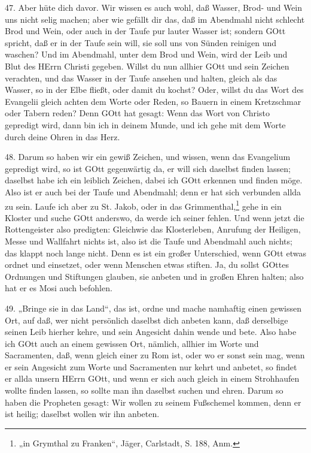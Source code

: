 47. Aber hüte dich davor. Wir wissen es auch wohl, daß Wasser, Brod- und Wein uns nicht selig machen; aber wie gefällt dir das, daß im Abendmahl nicht schlecht Brod und Wein, oder auch in der Taufe pur lauter Wasser ist; sondern GOtt spricht, daß er in der Taufe sein will, sie soll uns von Sünden reinigen und waschen? Und im Abendmahl, unter dem Brod und Wein, wird der Leib und Blut des HErrn Christi gegeben. Willst du nun allhier GOtt und sein Zeichen verachten, und das Wasser in der Taufe ansehen und halten, gleich als das Wasser, so in der Elbe fließt, oder damit du kochst? Oder, willst du das Wort des Evangelii gleich achten dem Worte oder Reden, so Bauern in einem Kretzschmar oder Tabern reden? Denn GOtt hat gesagt: Wenn das Wort von Christo gepredigt wird, dann bin ich in deinem Munde, und ich gehe mit dem Worte durch deine Ohren in das Herz.

48. Darum so haben wir ein gewiß Zeichen, und wissen, wenn das Evangelium gepredigt wird, so ist GOtt gegenwärtig da, er will sich daselbst finden lassen; daselbst habe ich ein leiblich Zeichen, dabei ich GOtt erkennen und finden möge. Also ist er auch bei der Taufe und Abendmahl; denn er hat sich verbunden allda zu sein. Laufe ich aber zu St. Jakob, oder in das Grimmenthal,\footnote{„in Grymthal zu Franken“, Jäger, Carlstadt, S. 188, Anm.} gehe in ein Kloster und suche GOtt anderswo, da werde ich seiner fehlen. Und wenn jetzt die Rottengeister also predigten: Gleichwie das Klosterleben, Anrufung der Heiligen, Messe und Wallfahrt nichts ist, also ist die Taufe und Abendmahl auch nichts; das klappt noch lange nicht. Denn es ist ein großer Unterschied, wenn GOtt etwas ordnet und einsetzet, oder wenn Menschen etwas stiften. Ja, du sollst GOttes Ordnungen und Stiftungen glauben, sie anbeten und in großen Ehren halten; also hat er es Mosi auch befohlen.

49. „Bringe sie in das Land“, das ist, ordne und mache namhaftig einen gewissen Ort, auf daß, wer nicht persönlich daselbst dich anbeten kann, daß derselbige seinen Leib hierher kehre, und sein Angesicht dahin wende und bete. Also habe ich GOtt auch an einem gewissen Ort, nämlich, allhier im Worte und Sacramenten, daß, wenn gleich einer zu Rom ist, oder wo er sonst sein mag, wenn er sein Angesicht zum Worte und Sacramenten nur kehrt und anbetet, so findet er allda unsern HErrn GOtt, und wenn er sich auch gleich in einem Strohhaufen wollte finden lassen, so sollte man ihn daselbst suchen und ehren. Darum so haben die Propheten gesagt: Wir wollen zu seinem Fußschemel kommen, denn er ist heilig; daselbst wollen wir ihn anbeten.

